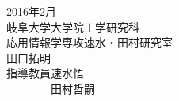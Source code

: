 \documentclass[a4paper,twocolumn,report,10.5pt]{jsbook}
\begin{document}
\begin{titlepage}
\begin{center}
{{\vspace{5zh}


\fontsize{22pt}{22pt}\selectfont %

2016年\hspace{0.5zh}2月\\%
\vspace{0.5zh}
岐阜大学大学院\hspace{1zh}工学研究科\hspace{1zh}\\%
\vspace{0.5zh}
応用情報学専攻\hspace{1zh}速水・田村研究室\\

\vspace{2zh}
田口\hspace{1zh}拓明\\

\vspace{3zh}
指導教員\hspace{1zh}速水\hspace{1zh}悟　\\
\vspace{0.5zh}
　　　　\hspace{1zh}田村\hspace{1zh}哲嗣\\
} %
}





\end{center}
\end{titlepage}


\tableofcontents
\newpage
{}





% 

% 

% 







\end{document}
